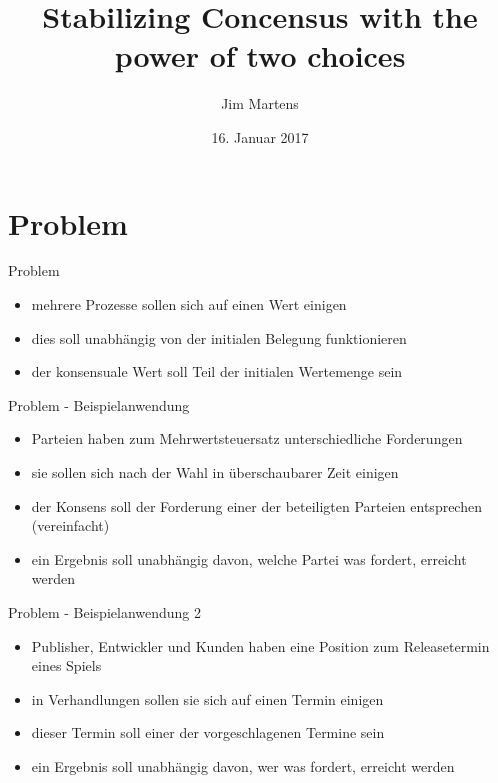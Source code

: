 \documentclass{beamer}
\begin{document}
\author{Jim Martens}
\title{Stabilizing Concensus with the power of two choices}
\date{16. Januar 2017}

	\begin{frame}
		\titlepage
	\end{frame}

    \begin{frame}
        \tableofcontents
    \end{frame}

    \section{Problem}
    \begin{frame}{Problem}
        \begin{itemize}
            \item mehrere Prozesse sollen sich auf einen Wert einigen
            \vfill
            \item dies soll unabhängig von der initialen Belegung funktionieren
            \vfill
            \item der konsensuale Wert soll Teil der initialen Wertemenge sein
        \end{itemize}
    \end{frame}

    \begin{frame}{Problem - Beispielanwendung}
        \begin{itemize}
            \item Parteien haben zum Mehrwertsteuersatz unterschiedliche Forderungen
            \vfill
            \item sie sollen sich nach der Wahl in überschaubarer Zeit einigen
            \vfill
            \item der Konsens soll der Forderung einer der beteiligten Parteien
                  entsprechen (vereinfacht)
            \vfill
            \item ein Ergebnis soll unabhängig davon, welche Partei was fordert,
                  erreicht werden
        \end{itemize}
    \end{frame}

    \begin{frame}{Problem - Beispielanwendung 2}
        \begin{itemize}
            \item Publisher, Entwickler und Kunden haben eine Position zum
                  Releasetermin eines Spiels
            \vfill
            \item in Verhandlungen sollen sie sich auf einen Termin einigen
            \vfill
            \item dieser Termin soll einer der vorgeschlagenen Termine sein
            \vfill
            \item ein Ergebnis soll unabhängig davon, wer was fordert,
                  erreicht werden
        \end{itemize}
    \end{frame}
\end{document}
